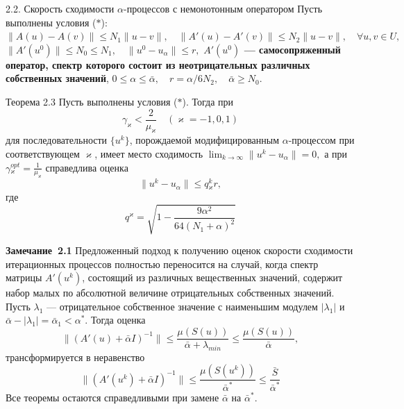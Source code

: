 \documentclass[10pt,pdf, mathserif, hyperref={unicode}]{beamer}
\begin{document}
%		
\begin{frame}{\small 2.2. Скорость сходимости $\alpha$-процессов с немонотонным оператором}
	Пусть выполнены условия ($*$):
	$\|A(u)-A(v)\|\leqslant N_1\|u-v\|, \quad \|A'(u)-A'(v)\|\leqslant N_2\|u-v\|, \quad \forall u, v \in U,$
	$\|A'(u^0)\| \leqslant N_0\leqslant N_1, \quad \|u^0-u_\alpha\| \leqslant r,$
	{\textbf{\color{blue}$A'(u^0)$ --- самосопряженный оператор, спектр которого состоит из неотрицательных различных собственных значений}}, 
	$0\leqslant\alpha\leqslant\bar{\alpha}, \quad r=\alpha/6N_2, \quad \bar{\alpha}\geqslant N_0.$
			
	\begin{block}{Теорема 2.3}
		Пусть выполнены условия ($*$). Тогда при
		$$\gamma _\varkappa <\frac{2}{\mu _\varkappa}\quad (\varkappa=-1,0,1)$$
		для последовательности $\{u^k\}$, порождаемой модифицированным $\alpha$-процессом при соответствующем $\varkappa$, имеет место сходимость $\lim_{k\to\infty}\|u^k-u_\alpha\|=0, $ а при 
		$\gamma{_\varkappa^{opt}}=\frac{1}{\mu_\varkappa}$
		справедлива оценка $$\|u^k-u_\alpha\|\leqslant q{_\varkappa^k}r,$$ где
		$$q^\varkappa=\sqrt{1-\frac{9\alpha^2}{64(N_1+\alpha)^2}}$$
	\end{block}
\end{frame}
\begin{frame}
	\begin{block}{\bf Замечание~2.1} Предложенный подход к получению оценок скорости сходимости итерационных процессов полностью переносится на случай, когда спектр матрицы $A'(u^k)$, состоящий из различных вещественных значений, содержит набор малых по абсолютной величине отрицательных собственных значений. Пусть $\lambda _1$ --- отрицательное собственное значение с наименьшим модулем $|\lambda_1|$ и $\bar\alpha -|\lambda _1|=\bar\alpha _1<\alpha^*$. Тогда оценка 
		$$\|(A'(u)+\bar\alpha I)^{-1}\|\leqslant \frac{\mu (S(u))}{\bar\alpha+\lambda_{min}} \leqslant \frac{\mu(S(u))}{\bar\alpha},$$ 
		трансформируется в неравенство
		$$\|(A'(u^k)+\bar\alpha I)^{-1}\|\leqslant\frac{\mu(S(u^k))}{\bar\alpha^*}\leqslant\frac{\bar S}{\bar\alpha^*}$$
		Все теоремы остаются справедливыми при замене $\bar\alpha$ на $\bar\alpha^*$.
	\end{block}
\end{frame}
\end{document}
